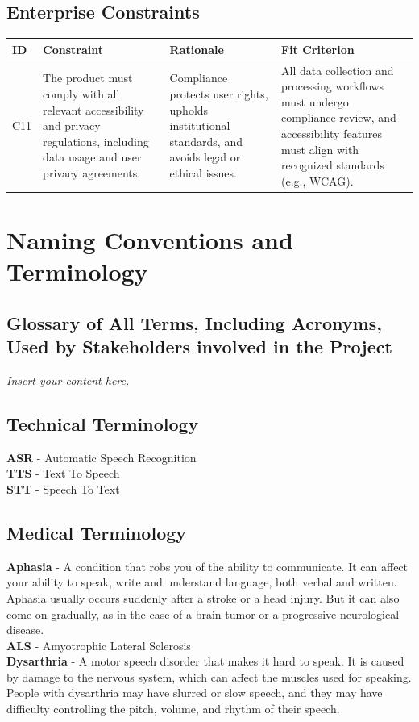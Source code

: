 \documentclass[12pt]{article}
\newcommand{\lips}{\textit{Insert your content here.}}
\begin{document}
\subsection{Enterprise Constraints}

\begin{tabularx}{\textwidth}{p{1cm}X X X}
\toprule
\textbf{ID} & \textbf{Constraint} & \textbf{Rationale} & \textbf{Fit Criterion} \\
\midrule
C11 & The product must comply with all relevant accessibility and privacy regulations, including data usage and user privacy agreements. & Compliance protects user rights, upholds institutional standards, and avoids legal or ethical issues. & All data collection and processing workflows must undergo compliance review, and accessibility features must align with recognized standards (e.g., WCAG). \\
\bottomrule
\end{tabularx}

\section{Naming Conventions and Terminology}
\subsection{Glossary of All Terms, Including Acronyms, Used by Stakeholders
involved in the Project}

\lips

\subsection{Technical Terminology}
\textbf{ASR} - Automatic Speech Recognition \\
\textbf{TTS} - Text To Speech \\
\textbf{STT} - Speech To Text \\


\subsection{Medical Terminology}
\textbf{Aphasia} - A condition that robs you of the ability to communicate. It can affect your ability to speak, write and understand language, both verbal and written. Aphasia usually occurs suddenly after a stroke or a head injury. But it can also come on gradually, as in the case of a brain tumor or a progressive neurological disease. \\
\textbf{ALS} - Amyotrophic Lateral Sclerosis \\
\textbf{Dysarthria} - A motor speech disorder that makes it hard to speak. It is caused by damage to the nervous system, which can affect the muscles used for speaking. People with dysarthria may have slurred or slow speech, and they may have difficulty controlling the pitch, volume, and rhythm of their speech. \\
\end{document}
